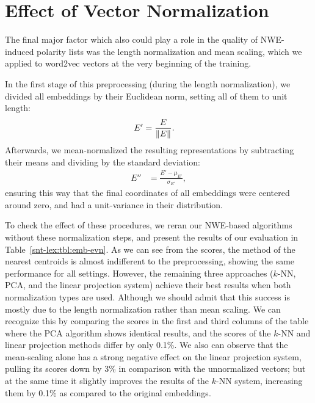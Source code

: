 \section{Effect of Vector Normalization}\label{subsec:snt-lex:eowet}

The final major factor which also could play a role in the quality of
NWE-induced polarity lists was the length normalization and mean
scaling, which we applied to word2vec vectors at the very beginning of
the training.

In the first stage of this preprocessing (during the length
normalization), we divided all embeddings by their Euclidean norm,
setting all of them to unit length:
\begin{align}
  E' &= \frac{E}{\left\lVert E\right\rVert}.
\end{align}
Afterwards, we mean-normalized the resulting representations by
subtracting their means and dividing by the standard deviation:
\begin{align}
  E'' &= \frac{E' -\mu_{E'}}{\sigma_{E'}},
\end{align}
ensuring this way that the final coordinates of all embeddings were
centered around zero, and had a unit-variance in their distribution.

To check the effect of these procedures, we reran our NWE-based
algorithms without these normalization steps, and present the results
of our evaluation in Table~\ref{snt-lex:tbl:emb-evn}.  As we can see
from the scores, the method of the nearest centroids is almost
indifferent to the preprocessing, showing the same performance for all
settings.  However, the remaining three approaches ($k$-NN, PCA, and
the linear projection system) achieve their best results when both
normalization types are used.  Although we should admit that this
success is mostly due to the length normalization rather than mean
scaling.  We can recognize this by comparing the scores in the first
and third columns of the table where the PCA algorithm shows identical
results, and the scores of the $k$-NN and linear projection methods
differ by only 0.1\%.  We also can observe that the mean-scaling alone
has a strong negative effect on the linear projection system, pulling
its scores down by 3\% in comparison with the unnormalized vectors;
but at the same time it slightly improves the results of the $k$-NN
system, increasing them by 0.1\% as compared to the original
embeddings.

